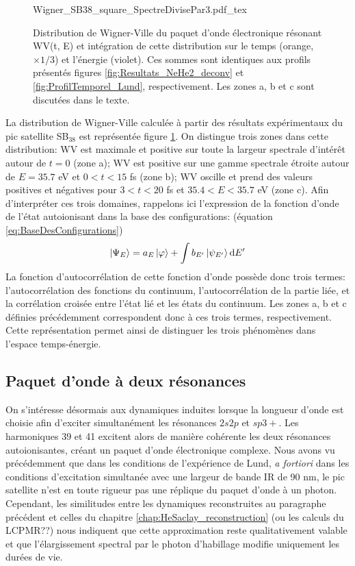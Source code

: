 \begin{figure}[h]
\centering
\def\svgwidth{\textwidth}
{Wigner_SB38_square_SpectreDivisePar3.pdf_tex}
\caption{Distribution de Wigner-Ville du paquet d'onde électronique résonant WV(t, E) et intégration de cette distribution sur le temps (orange, $\times 1/3$) et l'énergie (violet). Ces sommes sont identiques aux profils présentés figures \ref{fig:Resultats_NeHe2_deconv} et \ref{fig:ProfilTemporel_Lund}, respectivement. Les zones a, b et c sont discutées dans le texte.}
\label{fig:Wigner_SB38}
\end{figure}

La distribution de Wigner-Ville calculée à partir des résultats expérimentaux du pic satellite SB$_{38}$ est représentée figure \ref{fig:Wigner_SB38}. On distingue trois zones dans cette distribution: WV est maximale et positive sur toute la largeur spectrale d'intérêt autour de $t = 0$ (zone a); WV est positive sur une gamme spectrale étroite autour de $E = 35.7$ eV et $0 < t < 15$ fs (zone b); WV oscille et prend des valeurs positives et négatives pour $3 < t < 20$ fs et $35.4 < E < 35.7$ eV (zone c). Afin d'interpréter ces trois domaines, rappelons ici l'expression de la fonction d'onde de l'état autoionisant dans la base des configurations: (équation \ref{eq:BaseDesConfigurations})
\begin{equation}
\ket{\Psi_E} = a_E \ket{\varphi} + \int b_{E'} \ket{\psi_{E'}} \mathrm{d} E'
\end{equation}
La fonction d'autocorrélation de cette fonction d'onde possède donc trois termes:  l'autocorrélation des fonctions du continuum, l'autocorrélation de la partie liée, et la corrélation croisée entre l'état lié et les états du continuum. Les zones a, b et c définies précédemment correspondent donc à ces trois termes, respectivement. Cette représentation permet ainsi de distinguer les trois phénomènes dans l'espace temps-énergie.


\subsection{Paquet d'onde à deux résonances}
\label{subsec:Lund2resonances}
On s'intéresse désormais aux dynamiques induites lorsque la longueur d'onde est choisie afin d'exciter simultanément les résonances $2s2p$ et $sp3+$. Les harmoniques 39 et 41 excitent alors de manière cohérente les deux résonances autoionisantes, créant un paquet d'onde électronique complexe. Nous avons vu précédemment que dans les conditions de l'expérience de Lund, \textit{a fortiori} dans les conditions d'excitation simultanée avec une largeur de bande IR de 90 nm, le pic satellite n'est en toute rigueur pas une réplique du paquet d'onde à un photon. Cependant, les similitudes entre les dynamiques reconstruites au paragraphe précédent et celles du chapitre \ref{chap:HeSaclay_reconstruction} (ou les calculs du LCPMR??) nous indiquent que cette approximation reste qualitativement valable et que l'élargissement spectral par le photon d'habillage modifie uniquement les durées de vie.

